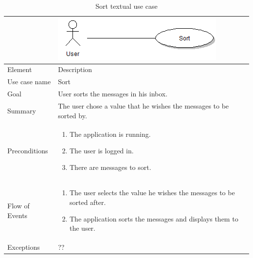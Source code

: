 \begin{table}
\begin{tabular}{p{3cm}p{12cm}}
& \includegraphics{sort}\\ \hline
Element & Description \\ \hline
Use case name & Sort \\
Goal & User sorts the messages in his inbox. \\
Summary & The user chose a value that he wishes the messages to be sorted by. \\
Preconditions &
\begin{enumerate}
\item{}The application is running.
\item{}The user is logged in.
\item{}There are messages to sort.
\end{enumerate} \\ \hline
Flow of Events &
\begin{enumerate}
\item{}The user selects the value he wishes the messages to be sorted after.
\item{}The application sorts the messages and displays them to the user.
\end{enumerate} \\ \hline
Exceptions & ??
\end{tabular}
\caption{Sort textual use case} \label{tab:search}
\end{table}

